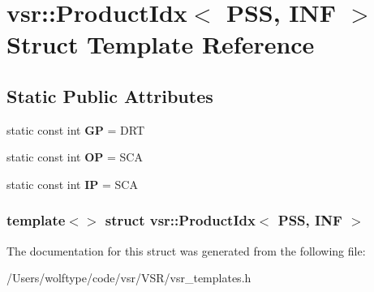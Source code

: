 \hypertarget{structvsr_1_1_product_idx_3_01_p_s_s_00_01_i_n_f_01_4}{\section{vsr\-:\-:Product\-Idx$<$ P\-S\-S, I\-N\-F $>$ Struct Template Reference}
\label{structvsr_1_1_product_idx_3_01_p_s_s_00_01_i_n_f_01_4}
}
\subsection*{Static Public Attributes}
\begin{DoxyCompactItemize}
\item 
\hypertarget{structvsr_1_1_product_idx_3_01_p_s_s_00_01_i_n_f_01_4_ac3dfc196c1f821a2ce81b3bec963ea75}{static const int {\bfseries G\-P} = D\-R\-T}\label{structvsr_1_1_product_idx_3_01_p_s_s_00_01_i_n_f_01_4_ac3dfc196c1f821a2ce81b3bec963ea75}

\item 
\hypertarget{structvsr_1_1_product_idx_3_01_p_s_s_00_01_i_n_f_01_4_a339ea64bb8aa9d2a9a1526a41f489908}{static const int {\bfseries O\-P} = S\-C\-A}\label{structvsr_1_1_product_idx_3_01_p_s_s_00_01_i_n_f_01_4_a339ea64bb8aa9d2a9a1526a41f489908}

\item 
\hypertarget{structvsr_1_1_product_idx_3_01_p_s_s_00_01_i_n_f_01_4_afa0ad9b07abad6220b368593ecc55bbf}{static const int {\bfseries I\-P} = S\-C\-A}\label{structvsr_1_1_product_idx_3_01_p_s_s_00_01_i_n_f_01_4_afa0ad9b07abad6220b368593ecc55bbf}

\end{DoxyCompactItemize}
\subsubsection*{template$<$$>$ struct vsr\-::\-Product\-Idx$<$ P\-S\-S, I\-N\-F $>$}



The documentation for this struct was generated from the following file\-:\begin{DoxyCompactItemize}
\item 
/\-Users/wolftype/code/vsr/\-V\-S\-R/vsr\-\_\-templates.\-h\end{DoxyCompactItemize}
